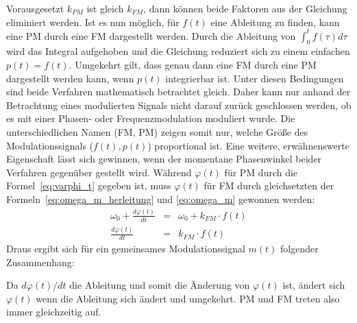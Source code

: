 Vorausgesetzt \(k_{PM}\) ist gleich \(k_{FM}\), dann können beide Faktoren aus der Gleichung eliminiert werden. Ist es nun möglich, für \(f(t)\) eine Ableitung zu finden, kann eine PM durch eine FM dargestellt werden. Durch die Ableitung von \(\int_0^t{f(\tau)}d\tau\) wird das Integral aufgehoben und die Gleichung reduziert sich zu einem einfachen \(p(t)=f(t)\). Umgekehrt gilt, dass genau dann eine FM durch eine PM dargestellt werden kann, wenn \(p(t)\) integrierbar ist. Unter diesen Bedingungen sind beide Verfahren mathematisch betrachtet gleich. Daher kann nur anhand der Betrachtung eines modulierten Signals nicht darauf zurück geschlossen werden, ob es mit einer Phasen- oder Frequenzmodulation moduliert wurde. Die unterschiedlichen Namen (FM, PM) zeigen somit nur, welche Größe des Modulationssignals (\(f(t), p(t)\)) proportional ist. \cite[S. 210]{lathi}
Eine weitere, erwähnenswerte Eigenschaft lässt sich gewinnen, wenn der momentane Phasenwinkel beider Verfahren gegenüber gestellt wird. Während \(\varphi(t)\) für PM durch die Formel~\ref{eq:varphi_t} gegeben ist, muss \(\varphi(t)\) für FM durch gleichsetzten der Formeln~\ref{eq:omega_m_herleitung} und \ref{eq:omega_m} gewonnen werden:
\begin{eqnarray*}
\omega_0+\frac{d\varphi(t)}{dt}&=&\omega_0+k_{FM}\cdot f(t) \\
\frac{d\varphi(t)}{dt}&=&k_{FM}\cdot f(t)
\end{eqnarray*}
Draus ergibt sich für ein gemeinsames Modulationssignal \(m(t)\) folgender Zusammenhang:
\begin{center}
\end{center}
Da \({d\varphi(t)}/{dt}\) die Ableitung und somit die Änderung von \(\varphi(t)\) ist, ändert sich \(\varphi(t)\) wenn die Ableitung sich ändert und umgekehrt. PM und FM treten also immer gleichzeitig auf.

